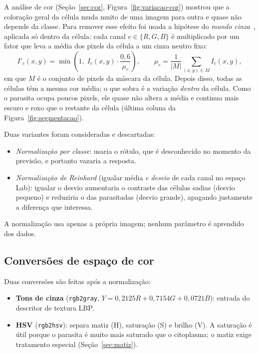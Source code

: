 \documentclass[11pt,a4paper]{article}
\begin{document}
A análise de cor (Seção~\ref{sec:cor}, Figura~\ref{fig:variacao-cor}) mostrou que a coloração geral
da célula muda muito de uma imagem para outra e quase não depende da classe. Para remover esse efeito
foi usada a hipótese do \emph{mundo
cinza}~\cite{buchsbaum1980}, aplicada só dentro da célula: cada canal $c\in\{R,G,B\}$ é multiplicado
por um fator que leva a média dos pixels da célula a um cinza neutro fixo:
\begin{equation}
  I'_c(x,y) = \min\!\left(1,\; I_c(x,y)\cdot\frac{0{,}6}{\mu_c}\right),
  \qquad \mu_c = \frac{1}{|M|}\sum_{(x,y)\in M} I_c(x,y),
\end{equation}
em que $M$ é o conjunto de pixels da máscara da célula. Depois disso, todas as células têm a mesma
cor média; o que sobra é a variação \emph{dentro} da célula. Como o parasita ocupa poucos pixels, ele
quase não altera a média e continua mais escuro e roxo que o restante da célula (última coluna da
Figura~\ref{fig:segmentacao}).

Duas variantes foram consideradas e descartadas:
\begin{itemize}
  \item \emph{Normalização por classe}: usaria o rótulo, que é desconhecido no momento da previsão,
        e portanto vazaria a resposta.
  \item \emph{Normalização de Reinhard} (igualar média \emph{e desvio} de cada canal no espaço Lab):
        igualar o desvio aumentaria o contraste das células sadias (desvio pequeno) e reduziria o das
        parasitadas (desvio grande), apagando justamente a diferença que interessa.
\end{itemize}
A normalização usa apenas a própria imagem; nenhum parâmetro é aprendido dos dados.

\subsection{Conversões de espaço de cor}

Duas conversões são feitas após a normalização:
\begin{itemize}
  \item \textbf{Tons de cinza} (\texttt{rgb2gray}, $Y = 0{,}2125R + 0{,}7154G + 0{,}0721B$): entrada do
        descritor de textura LBP.
  \item \textbf{HSV} (\texttt{rgb2hsv}): separa matiz (H), saturação (S) e brilho (V). A saturação é
        útil porque o parasita é muito mais saturado que o citoplasma; o matiz exige tratamento
        especial (Seção~\ref{sec:matiz}).
\end{itemize}
\end{document}

